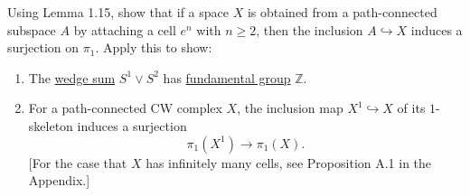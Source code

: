 	\begin{exercise}[Hatcher 1.1.18]
		Using Lemma 1.15, show that if a space $X$ is obtained from a path-connected subspace $A$ by attaching a cell $e^n$ with $n \geq 2$, then the inclusion $A \hookrightarrow X$ induces a surjection on $\pi_1$. Apply this to show:
		\begin{enumerate}
			\item[(a)] The \hyperref[pst-def:wedge-sum]{wedge sum} $S^1 \vee S^2$ has \hyperref[def:fundamental-group]{fundamental group} $\mathbb{Z}$.
			\item[(b)] For a path-connected CW complex $X$, the inclusion map $X^1 \hookrightarrow X$ of its $1$-skeleton induces a surjection
			\begin{equation}
			  \pi_1(X^1) \to \pi_1(X).
			\end{equation}
			[For the case that $X$ has infinitely many cells, see Proposition A.1
			in the Appendix.]
		\end{enumerate}
	\end{exercise}
